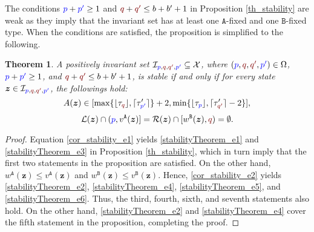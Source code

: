 \documentclass[10 pt,twocolumn,journal]{IEEEtran}
\DeclarePairedDelimiter{\ceil}{\lceil}{\rceil}
\DeclarePairedDelimiter{\floor}{\lfloor}{\rfloor}
\theoremstyle{plain}
\newtheorem{theorem}{Theorem}
\newcommand{\A}{\mathcal{A}}
\newcommand{\I}{\mathcal{I}}
\newcommand{\X}{\mathcal{X}}
\newcommand{\W}{\mathcal{W}}
\newcommand{\R}{\mathcal{R}}
\renewcommand{\L}{\mathcal{L}}
\newcommand{\z}{\bm{z}}
\newcommand{\p}{\tb{p}}
\newcommand{\pp}{\tb{p'}}
\newcommand{\q}{\tr{q}}
\newcommand{\qq}{\tr{q'}}
\renewcommand{\A}{\mathtt{A}}
\newcommand{\B}{\mathtt{B}}
\newcommand{\tb}{\textcolor{blue}}
\newcommand{\tr}{\textcolor{Myred}}
\theoremstyle{definition}
\begin{document}
The conditions $\p+\pp\geq 1$ and $\q+\qq \leq b+b'+1$ in Proposition \ref{th_stability} are weak as they imply that the invariant set has at least one $\A$-fixed and one $\B$-fixed type.
When the conditions are satisfied, the proposition is simplified to the following.
\begin{theorem} \label{cor_stability}
    A positively invariant set $\I_{\p,\q,\qq ,\pp }\subseteq\X$, where $(\p,\q,\qq,\pp)\in\Omega$, $\p+\pp\geq 1$, and $\q+\qq \leq b+b'+1$, is stable if and only if for every state $\z\in\I_{\p,\q,\qq ,\pp }$, the followings hold:
    \begin{equation}    \label{cor_stability_e1}
        A(\z)\in[\max\{\floor{\tau_{\q}},\ceil{\tau'_{\pp }}\}+2, \min\{\floor{\tau_{\p}},\ceil{\tau'_{\qq }}-2\}],
    \end{equation}
    \begin{equation}    \label{cor_stability_e2}
        \L(\z)\cap(\p,v^{\A}(\z)] 
        =\R(\z)\cap[w^{\B}(\z),\q)
        =\emptyset.
    \end{equation}
\end{theorem}
\begin{proof}
    Equation \eqref{cor_stability_e1} yields
    \eqref{stabilityTheorem_e1} and \eqref{stabilityTheorem_e3} in
    Proposition \ref{th_stability}, which in turn imply that the first two statements in the proposition are satisfied. 
    On the other hand, $w^{\A}(\z)\leq v^{\A}(\z)$ and $w^{\B}(\z)\leq v^{\B}(\z)$.
    Hence, \eqref{cor_stability_e2} yields  \eqref{stabilityTheorem_e2}, \eqref{stabilityTheorem_e4}, \eqref{stabilityTheorem_e5}, and \eqref{stabilityTheorem_e6}.
    Thus, the third, fourth, sixth, and seventh statements also hold. 
    On the other hand, \eqref{stabilityTheorem_e2} and \eqref{stabilityTheorem_e4} cover the fifth statement in the proposition, completing the proof.
\end{proof}
\end{document}
